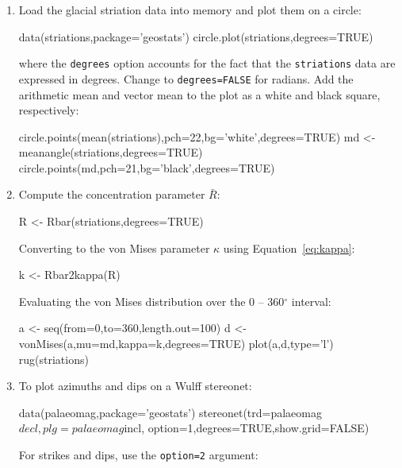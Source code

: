 \begin{enumerate}

\item Load the glacial striation data into memory and plot them on a
  circle:

\begin{script}
data(striations,package='geostats')
circle.plot(striations,degrees=TRUE)
\end{script}

\noindent where the \texttt{degrees} option accounts for the fact that
the \texttt{striations} data are expressed in degrees.  Change to
\texttt{degrees=FALSE} for radians. Add the arithmetic mean and vector
mean to the plot as a white and black square, respectively:

\begin{script}[firstnumber=3]
circle.points(mean(striations),pch=22,bg='white',degrees=TRUE)
md <- meanangle(striations,degrees=TRUE)
circle.points(md,pch=21,bg='black',degrees=TRUE)
\end{script}

\item\label{it:Rbar} Compute the concentration parameter $\bar{R}$:

\begin{script}
R <- Rbar(striations,degrees=TRUE)
\end{script}

Converting to the von Mises parameter $\kappa$ using
Equation~\ref{eq:kappa}:

\begin{script}[firstnumber=2]
k <- Rbar2kappa(R)
\end{script}

Evaluating the von Mises distribution over the 0 -- 360$^{\circ}$
interval:

\begin{script}[firstnumber=3]
a <- seq(from=0,to=360,length.out=100)
d <- vonMises(a,mu=md,kappa=k,degrees=TRUE)
plot(a,d,type='l')
rug(striations)
\end{script}

\item To plot azimuths and dips on a Wulff stereonet:

\begin{script}
data(palaeomag,package='geostats')
stereonet(trd=palaeomag$decl,plg=palaeomag$incl,
          option=1,degrees=TRUE,show.grid=FALSE)
\end{script}

For strikes and dips, use the \texttt{option=2} argument:


\end{enumerate}
